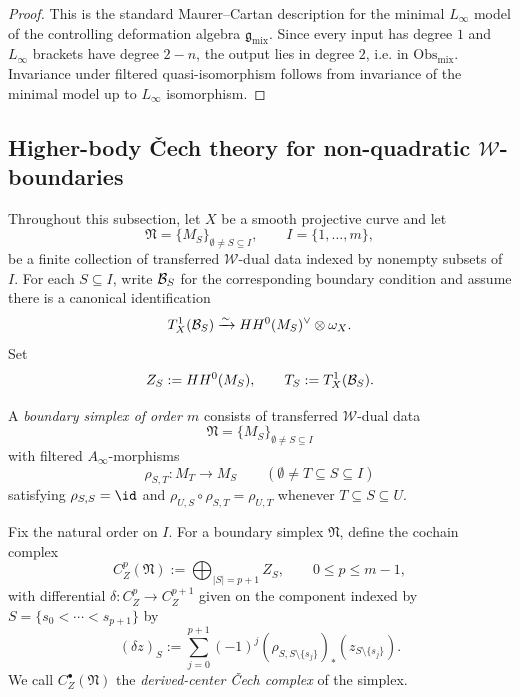 \begin{proof}
This is the standard Maurer--Cartan description for the minimal $L_\infty$ model of the controlling deformation algebra $\mathfrak g_{\mathrm{mix}}$. Since every input has degree $1$ and $L_\infty$ brackets have degree $2-n$, the output lies in degree $2$, i.e. in $\mathrm{Obs}_{\mathrm{mix}}$. Invariance under filtered quasi-isomorphism follows from invariance of the minimal model up to $L_\infty$ isomorphism.
\end{proof}

\subsection{Higher-body \v{C}ech theory for non-quadratic $\mathcal W$-boundaries}
\label{subsec:w-boundary-cech-theory}

\begin{convention}
\label{conv:derived-tangent-center-input}
Throughout this subsection, let $X$ be a smooth projective curve and let
\[
\mathfrak N=\{M_S\}_{\emptyset\neq S\subseteq I},\qquad I=\{1,\dots,m\},
\]
be a finite collection of transferred $\mathcal W$-dual data indexed by nonempty subsets of $I$.
For each $S\subseteq I$, write $\mathcal{B}_S$ for the corresponding boundary condition and assume there is a canonical identification
\[
T^1_X(\mathcal{B}_S)
\xrightarrow{\sim}
HH^0(M_S)^\vee\otimes \omega_X.
\]
Set
\[
Z_S:=HH^0(M_S),\qquad T_S:=T^1_X(\mathcal{B}_S).
\]
\end{convention}

\begin{definition}
\label{def:w-boundary-simplex}
A \emph{boundary simplex of order $m$} consists of transferred $\mathcal W$-dual data
\[
\mathfrak N=\{M_S\}_{\emptyset\neq S\subseteq I}
\]
with filtered $A_\infty$-morphisms
\[
\rho_{S,T}\colon M_T\longrightarrow M_S
\qquad (\emptyset\neq T\subseteq S\subseteq I)
\]
satisfying $\rho_{S,S}=\id$ and $\rho_{U,S}\circ \rho_{S,T}=\rho_{U,T}$ whenever
$T\subseteq S\subseteq U$.
\end{definition}

\begin{definition}
\label{def:w-derived-center-cech}
Fix the natural order on $I$. For a boundary simplex $\mathfrak N$, define the cochain complex
\[
C_Z^p(\mathfrak N):=\bigoplus_{|S|=p+1} Z_S,
\qquad 0\le p\le m-1,
\]
with differential $\delta\colon C_Z^p\to C_Z^{p+1}$ given on the component indexed by
$S=\{s_0<\cdots<s_{p+1}\}$ by
\[
(\delta z)_S
:=
\sum_{j=0}^{p+1}(-1)^j (\rho_{S,S\setminus\{s_j\}})_*(z_{S\setminus\{s_j\}}).
\]
We call $C_Z^\bullet(\mathfrak N)$ the \emph{derived-center \v{C}ech complex} of the simplex.
\end{definition}

